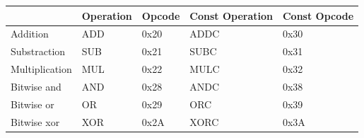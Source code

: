 \begin{table}[H]
    \centering
    \begin{tabular}{|l|l|l|l|l|}
    \hline
    \rowcolor[HTML]{DAE8FC} 
    \multicolumn{1}{|c|}{\cellcolor[HTML]{DAE8FC}\textbf{Name}} & \multicolumn{1}{c|}{\cellcolor[HTML]{DAE8FC}\textbf{Operation}} & \multicolumn{1}{c|}{\cellcolor[HTML]{DAE8FC}\textbf{Opcode}} & \multicolumn{1}{c|}{\cellcolor[HTML]{DAE8FC}\textbf{Const Operation}} & \multicolumn{1}{c|}{\cellcolor[HTML]{DAE8FC}\textbf{Const Opcode}} \\ \hline
    Addition                                                    & ADD                                                             & 0x20                                                         & ADDC                                                                  & 0x30                                                               \\ \hline
    Substraction                                                & SUB                                                             & 0x21                                                         & SUBC                                                                  & 0x31                                                               \\ \hline
    Multiplication                                              & MUL                                                             & 0x22                                                         & MULC                                                                  & 0x32                                                               \\ \hline
    Bitwise and                                                 & AND                                                             & 0x28                                                         & ANDC                                                                  & 0x38                                                               \\ \hline
    Bitwise or                                                  & OR                                                              & 0x29                                                         & ORC                                                                   & 0x39                                                               \\ \hline
    Bitwise xor                                                 & XOR                                                             & 0x2A                                                         & XORC                                                                  & 0x3A                                                               \\ \hline

\end{tabular}
\end{table}
